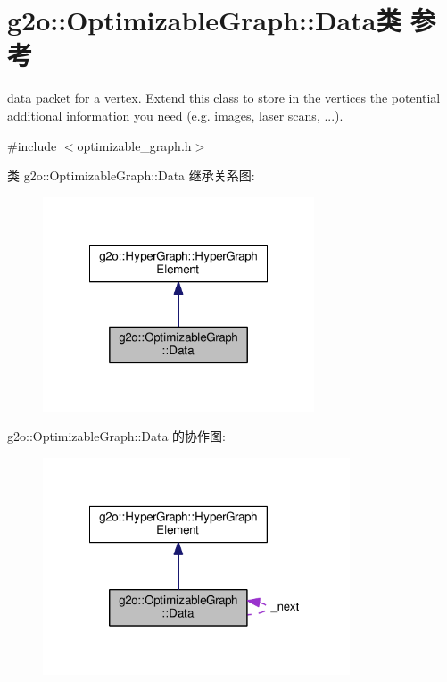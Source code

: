 \hypertarget{classg2o_1_1OptimizableGraph_1_1Data}{\section{g2o\-:\-:Optimizable\-Graph\-:\-:Data类 参考}
\label{classg2o_1_1OptimizableGraph_1_1Data}
}


data packet for a vertex. Extend this class to store in the vertices the potential additional information you need (e.\-g. images, laser scans, ...).  




{\ttfamily \#include $<$optimizable\-\_\-graph.\-h$>$}



类 g2o\-:\-:Optimizable\-Graph\-:\-:Data 继承关系图\-:
\nopagebreak
\begin{figure}[H]
\begin{center}
\leavevmode
\includegraphics[width=228pt]{classg2o_1_1OptimizableGraph_1_1Data__inherit__graph}
\end{center}
\end{figure}


g2o\-:\-:Optimizable\-Graph\-:\-:Data 的协作图\-:
\nopagebreak
\begin{figure}[H]
\begin{center}
\leavevmode
\includegraphics[width=258pt]{classg2o_1_1OptimizableGraph_1_1Data__coll__graph}
\end{center}
\end{figure}
